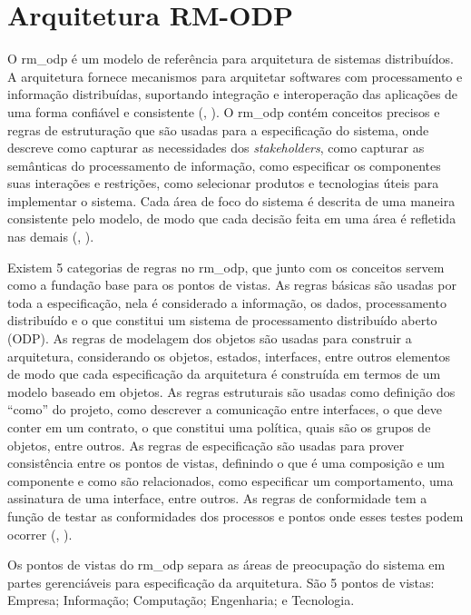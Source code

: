\documentclass[]{politex}
\begin{document}
\section{Arquitetura RM-ODP}
O \acrfull{rm_odp} é um modelo de referência para arquitetura de sistemas distribuídos. A arquitetura fornece mecanismos para arquitetar softwares com processamento e informação distribuídas, suportando integração e interoperação das aplicações de uma forma confiável e consistente  (, \citeyear{putman2001architecting}). O \acrshort{rm_odp} contém conceitos precisos e regras de estruturação que são usadas para a especificação do sistema, onde descreve como capturar as necessidades dos \textit{stakeholders}, como capturar as semânticas do processamento de informação, como especificar os componentes suas interações e restrições, como selecionar produtos e tecnologias úteis para implementar o sistema. Cada área de foco do sistema é descrita de uma maneira consistente pelo modelo, de modo que cada decisão feita em uma área é refletida nas demais  (, \citeyear{putman2001architecting}). 

Existem 5 categorias de regras no \acrshort{rm_odp}, que junto com os conceitos servem como a fundação base para os pontos de vistas. As regras básicas são usadas por toda a especificação, nela é considerado a informação, os dados, processamento distribuído e o que constitui um sistema de processamento distribuído aberto (ODP). As regras de modelagem dos objetos são usadas para construir a arquitetura, considerando os objetos, estados, interfaces, entre outros elementos de modo que cada especificação da arquitetura é construída em termos de um modelo baseado em objetos. As regras estruturais são usadas como definição dos “como” do projeto, como descrever a comunicação entre interfaces, o que deve conter em um contrato, o que constitui uma política, quais são os grupos de objetos, entre outros. As regras de especificação são usadas para prover consistência entre os pontos de vistas, definindo o que é uma composição e um componente e como são relacionados, como especificar um comportamento, uma assinatura de uma interface, entre outros. As regras de conformidade tem a função de testar as conformidades dos processos e pontos onde esses testes podem ocorrer (, \citeyear{putman2001architecting}).

Os pontos de vistas do \acrshort{rm_odp} separa as áreas de preocupação do sistema em partes gerenciáveis para especificação da arquitetura. São 5 pontos de vistas: Empresa; Informação; Computação; Engenharia; e Tecnologia.
\end{document}
